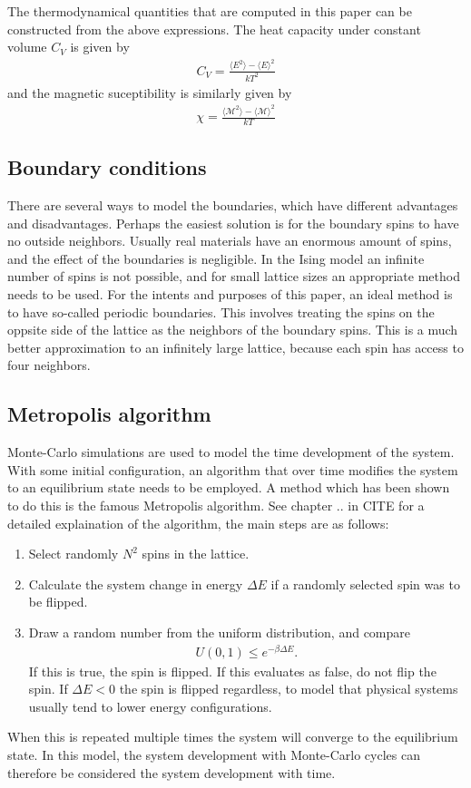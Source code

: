 \documentclass[aps,reprint]{revtex4-1}
\newcommand{\mean}[1]{\langle #1 \rangle}
\begin{document}
The thermodynamical quantities that are computed in this paper can be constructed
from the above expressions. The heat capacity under constant volume $C_V$ is given
by
\begin{align}
  C_V = \frac{\mean{E^2} - \mean{E}^2}{kT^2}
\end{align}
and the magnetic suceptibility is similarly given by
\begin{align}
  \chi = \frac{\mean{\mathcal{M}^2} - \mean{\mathcal{M}}^2}{kT}
\end{align}

\subsection{Boundary conditions}
There are several ways to model the boundaries, which have different advantages
and disadvantages. Perhaps the easiest solution is for the boundary spins to have
no outside neighbors. Usually real materials have an enormous amount of spins,
and the effect of the boundaries is negligible. In the Ising model an infinite
number of spins is not possible, and for small lattice sizes an appropriate
method needs to be used. For the intents and purposes of this paper, an ideal
method is to have so-called periodic boundaries. This involves treating the
spins on the oppsite side of the lattice as the neighbors of the boundary spins.
This is a much better approximation to an infinitely large lattice, because
each spin has access to four neighbors.

\subsection{Metropolis algorithm}
Monte-Carlo simulations are used to model the time development of the system.
With some initial configuration, an algorithm that over time modifies the system
to an equilibrium state needs to be employed. A method which has been shown to
do this is the famous Metropolis algorithm. See chapter .. in CITE for a detailed explaination
of the algorithm, the main steps are as follows:
\begin{enumerate}
  \item Select randomly $N^2$ spins in the lattice.
  \item Calculate the system change in energy $\Delta E$ if a randomly selected spin was to
  be flipped.
  \item Draw a random number from the uniform distribution, and compare
  \begin{align*}
    U(0,1) \leq e^{-\beta \Delta E}.
  \end{align*}
  If this is true, the spin is flipped. If this evaluates as false, do not flip
  the spin. If $\Delta E < 0$ the spin is flipped regardless, to model that physical
  systems usually tend to lower energy configurations.
\end{enumerate}
When this is repeated multiple times the system will converge to the equilibrium
state. In this model, the system development with Monte-Carlo cycles can therefore be
considered the system development with time.
\end{document}

